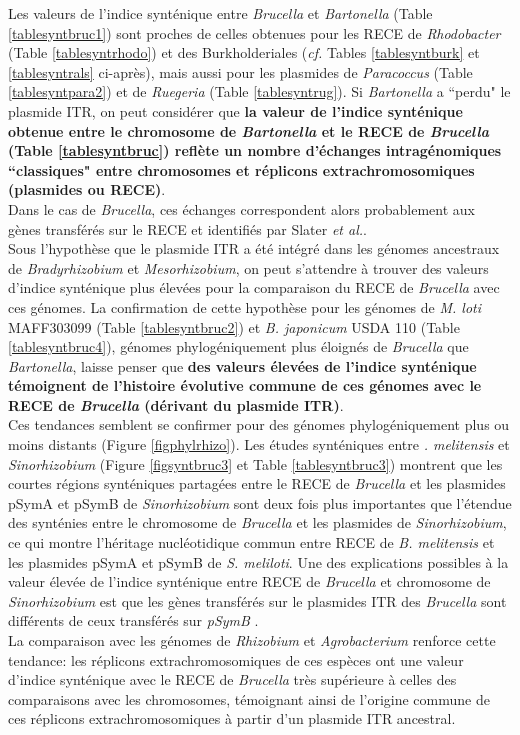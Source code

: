   Les valeurs de l'indice synténique entre \textit{Brucella} et \textit{Bartonella} (Table \ref{tablesyntbruc1}) sont proches de celles obtenues pour les RECE de \textit{Rhodobacter} (Table \ref{tablesyntrhodo}) et des Burkholderiales (\textit{cf.} Tables \ref{tablesyntburk} et \ref{tablesyntrals} ci-après), mais aussi pour les plasmides de \textit{Paracoccus} (Table \ref{tablesyntpara2}) et de \textit{Ruegeria} (Table \ref{tablesyntrug}). Si \textit{Bartonella} a ``perdu" le plasmide ITR, on peut considérer que \textbf{la valeur de l'indice synténique obtenue entre le chromosome de \textit{Bartonella} et le RECE de \textit{Brucella} (Table \ref{tablesyntbruc}) reflète un nombre d'échanges intragénomiques ``classiques" entre chromosomes et réplicons extrachromosomiques (plasmides ou RECE)}. \\Dans le cas de \textit{Brucella}, ces échanges correspondent alors probablement aux gènes transférés sur le RECE et identifiés par Slater \textit{et al.}. \\
Sous l'hypothèse que le plasmide ITR a été intégré dans les génomes ancestraux de \textit{Bradyrhizobium} et \textit{Mesorhizobium}, on peut s'attendre à trouver des valeurs d'indice synténique plus élevées pour la comparaison du RECE de \textit{Brucella} avec ces génomes. La confirmation de cette hypothèse pour les génomes de \textit{M. loti} MAFF303099 (Table \ref{tablesyntbruc2}) et \textit{B. japonicum} USDA 110 (Table \ref{tablesyntbruc4}), génomes phylogéniquement plus éloignés de \textit{Brucella} que \textit{Bartonella}, laisse penser que \textbf{des valeurs élevées de l'indice synténique témoignent de l'histoire évolutive commune de ces génomes avec le RECE de \textit{Brucella} (dérivant du plasmide ITR)}. 
\\Ces tendances semblent se confirmer pour des génomes phylogéniquement plus ou moins distants (Figure \ref{figphylrhizo}). Les études synténiques entre \textit{. melitensis} et \textit{Sinorhizobium} (Figure \ref{figsyntbruc3} et Table \ref{tablesyntbruc3}) montrent que les courtes régions synténiques partagées entre le RECE de \textit{Brucella} et les plasmides pSymA et pSymB de \textit{Sinorhizobium} sont deux fois plus importantes que l'étendue des synténies entre le chromosome de \textit{Brucella} et les plasmides de \textit{Sinorhizobium}, ce qui montre l'héritage nucléotidique commun entre RECE de  \textit{B. melitensis} et les plasmides pSymA et pSymB de \textit{S. meliloti}. Une des explications possibles à la valeur élevée de l'indice synténique entre RECE de \textit{Brucella} et chromosome de \textit{Sinorhizobium} est que les gènes transférés sur le plasmides ITR des \textit{Brucella} sont différents de ceux transférés sur \textit{pSymB} \citep{Slater2009}. \\
La comparaison avec les génomes de \textit{Rhizobium} et \textit{Agrobacterium} renforce cette tendance: les réplicons extrachromosomiques de ces espèces ont une valeur d'indice synténique avec le RECE de \textit{Brucella} très supérieure à celles des comparaisons avec les chromosomes, témoignant ainsi de l'origine commune de ces réplicons extrachromosomiques à partir d'un plasmide ITR ancestral. 

